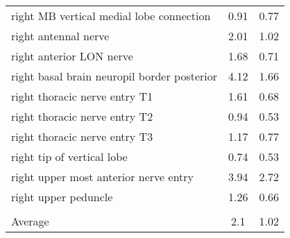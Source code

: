 \begin{tabular}{lcc}
 right MB vertical medial lobe connection    & 0.91          & 0.77             \\
 right antennal nerve                        & 2.01          & 1.02             \\
 right anterior LON nerve                    & 1.68          & 0.71             \\
 right basal brain neuropil border posterior & 4.12          & 1.66             \\
 right thoracic nerve entry T1               & 1.61          & 0.68             \\
 right thoracic nerve entry T2               & 0.94          & 0.53             \\
 right thoracic nerve entry T3               & 1.17          & 0.77             \\
 right tip of vertical lobe                  & 0.74          & 0.53             \\
 right upper most anterior nerve entry       & 3.94          & 2.72             \\
 right upper peduncle                        & 1.26          & 0.66             \\
                                             &               &                  \\ \hline \hline
 Average                                     & 2.1           & 1.02             \\
\hline
\end{tabular}